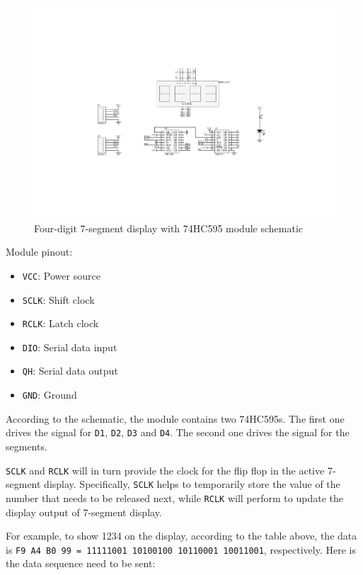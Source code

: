 \documentclass[a4paper,twoside]{report}
\begin{document}
\begin{figure}[H]
\centering
\includegraphics[scale=0.82]{images/7seg_module_schem.pdf}
\caption{Four-digit 7-segment display with 74HC595 module schematic}
\end{figure}

Module pinout:
\begin{multicols}{2}
\begin{itemize}
\item \texttt{VCC}: Power source
\item \texttt{SCLK}: Shift clock
\item \texttt{RCLK}: Latch clock
\item \texttt{DIO}: Serial data input
\item \texttt{QH}: Serial data output
\item \texttt{GND}: Ground
\end{itemize}
\end{multicols}
According to the schematic, the module contains two 74HC595s. The first one drives the signal for \texttt{D1}, \texttt{D2}, \texttt{D3} and \texttt{D4}. The second one drives the signal for the segments. 

\texttt{SCLK} and \texttt{RCLK} will in turn provide the clock for the flip flop in the active 7-segment display. Specifically, \texttt{SCLK} helps to temporarily store the value of the number that needs to be released next, while \texttt{RCLK} will perform to update the display output of 7-segment display.

For example, to show 1234 on the display, according to the table above, the data is \texttt{F9 A4 B0 99 = 11111001 10100100 10110001 10011001}, respectively. Here is the data sequence need to be sent:
\end{document}
